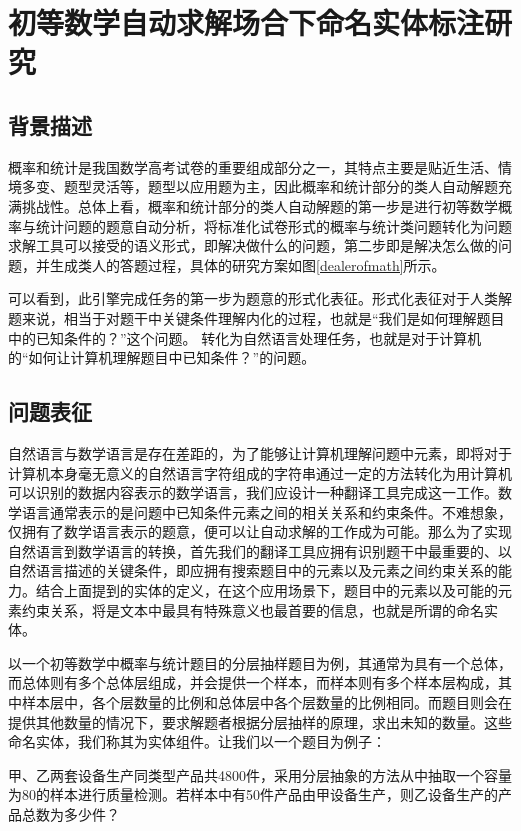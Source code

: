 
\chapter{初等数学自动求解场合下命名实体标注研究}
\section{背景描述}
概率和统计是我国数学高考试卷的重要组成部分之一，其特点主要是贴近生活、情境多变、题型灵活等，题型以应用题为主，因此概率和统计部分的类人自动解题充满挑战性。总体上看，概率和统计部分的类人自动解题的第一步是进行初等数学概率与统计问题的题意自动分析，将标准化试卷形式的概率与统计类问题转化为问题求解工具可以接受的语义形式，即解决做什么的问题，第二步即是解决怎么做的问题，并生成类人的答题过程，具体的研究方案如图\ref{dealerofmath}所示。

可以看到，此引擎完成任务的第一步为题意的形式化表征。形式化表征对于人类解题来说，相当于对题干中关键条件理解内化的过程，也就是“我们是如何理解题目中的已知条件的？”这个问题。 转化为自然语言处理任务，也就是对于计算机的“如何让计算机理解题目中已知条件？”的问题。

\section{问题表征}
自然语言与数学语言是存在差距的，为了能够让计算机理解问题中元素，即将对于计算机本身毫无意义的自然语言字符组成的字符串通过一定的方法转化为用计算机可以识别的数据内容表示的数学语言，我们应设计一种翻译工具完成这一工作。数学语言通常表示的是问题中已知条件元素之间的相关关系和约束条件。不难想象，仅拥有了数学语言表示的题意，便可以让自动求解的工作成为可能。那么为了实现自然语言到数学语言的转换，首先我们的翻译工具应拥有识别题干中最重要的、以自然语言描述的关键条件，即应拥有搜索题目中的元素以及元素之间约束关系的能力。结合上面提到的实体的定义，在这个应用场景下，题目中的元素以及可能的元素约束关系，将是文本中最具有特殊意义也最首要的信息，也就是所谓的命名实体。  

以一个初等数学中概率与统计题目的分层抽样题目为例，其通常为具有一个总体，而总体则有多个总体层组成，并会提供一个样本，而样本则有多个样本层构成，其中样本层中，各个层数量的比例和总体层中各个层数量的比例相同。而题目则会在提供其他数量的情况下，要求解题者根据分层抽样的原理，求出未知的数量。这些命名实体，我们称其为实体组件。让我们以一个题目为例子：

甲、乙两套设备生产同类型产品共4800件，采用分层抽象的方法从中抽取一个容量为80的样本进行质量检测。若样本中有50件产品由甲设备生产，则乙设备生产的产品总数为多少件？

